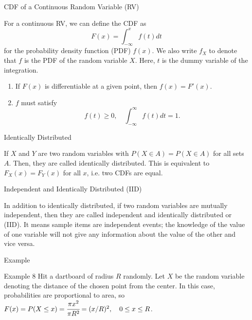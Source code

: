 \documentclass[aspectratio=169,xcolor=dvipsnames,svgnames,x11names,fleqn]{beamer}
\begin{document}
\begin{frame}[containsverbatim]{CDF of a Continuous Random Variable (RV)}
    
    
  
    For a continuous RV, we can define the CDF as 
    \begin{equation}
        F(x) = \int_{-\infty}^{x} f(t)dt 
    \end{equation}
    for the probability density function (PDF) $f(x)$. We also write $f_X$ to denote that $f$ is the PDF of the random variable $X$.
    Here, $t$ is the dummy variable of the integration. 
    \begin{enumerate}
        \item If $F(x)$ is differentiable at a given point, then $f(x) = F'(x)$.
        \item $f$ must satisfy
        \begin{equation}
            f(t) \geq 0, \quad \int_{-\infty}^\infty f(t)dt = 1.
        \end{equation}
    \end{enumerate}
    
\end{frame}
\begin{frame}[containsverbatim]{Identically Distributed}
    


        If $X$ and $Y$ are two random variables with $P(X \in A) = P(X \in A)$ for all sets $A$. Then, they are called identically distributed. This is equivalent to $F_X(x) = F_Y(x)$ for all $x$, i.e. two CDFs are equal.
    \end{frame}
    \begin{frame}[containsverbatim]{Independent and Identically Distributed (IID)}
        
        In addition to identically distributed, if two random variables are mutually independent, then they are called independent and identically distributed or (IID). It means sample items are independent events; the knowledge of the value of one variable will not give any information about the value of the other and vice versa.
 
    \end{frame}

    \begin{frame}[containsverbatim]{Example}
        

    \begin{exampleblock}{Example 8}
        Hit a dartboard of radius $R$ randomly. Let $X$ be the random variable denoting the distance of the chosen point from the center. In this case, probabilities are proportional to area, so $F(x) = P(X\leq x) = \cfrac{\pi x^2}{\pi R^2} = (x/R)^2, \quad 0 \leq x \leq R$. 
    \end{exampleblock}
    \end{frame}
    
\end{document}
